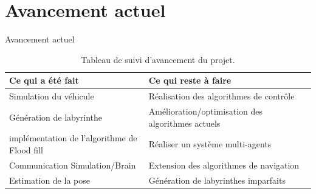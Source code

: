 \documentclass{beamer}
\begin{document}
\section{Avancement actuel}
\begin{frame}{Avancement actuel}

\begin{center}

\begin{table}[H]
    \centering
    \begin{tabularx}{\textwidth}{X X}
        \toprule
            \textbf{Ce qui a été fait} & \textbf{Ce qui reste à faire} \\
        \midrule
            Simulation du véhicule & 
            Réalisation des algorithmes de contrôle\\ 
            \hline
            
            Génération de labyrinthe & 
            Amélioration/optimisation des algorithmes actuels \\ 
            \hline
            
            implémentation de l'algorithme de Flood fill  &     
            Réaliser un système multi-agents\\
            \hline
            
            Communication Simulation/Brain & 
            Extension des algorithmes de navigation\\
            \hline

            Estimation de la pose &
            Génération de labyrinthes imparfaits \\
        \bottomrule
    \end{tabularx}
    \caption{Tableau de suivi d'avancement du projet.}
\end{table}

\end{center}

\end{frame}

\end{document}
